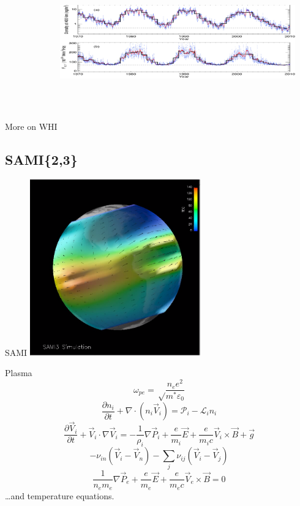 \documentclass{beamer}
\begin{document}
\begin{frame}
  {More on WHI}
  \includegraphics[width=4in,height=3in]{whi}
\end{frame}

\subsection{SAMI\{2,3\}}
\begin{frame}{SAMI}
 \includegraphics[height=3.0in]{SAMI}
\end{frame}

\begin{frame}{Plasma}
  \vspace{-1cm}
  \[ \omega_{pe} = \sqrt\frac{n_e e^2}{m^*\varepsilon_0} \]
  \[ \frac{\partial n_i}{\partial t} + \nabla \cdot \left( n_i\vec V_i \right) = \mathcal P_i - \mathcal L_i n_i \]
  \[ \frac{\partial \vec V_i}{\partial t} + \vec V_i \cdot \nabla \vec V_i = 
     -\frac1{\rho_i} \nabla\vec P_i 
     + \frac e{m_i}\vec E + \frac e{m_ic} \vec V_i \times \vec B 
     +\vec g \]
  \[  -\nu_{in} \left( \vec V_i -\vec V_n \right)
     -\sum_j \nu_{ij} \left( \vec V_i -\vec V_j\right) \]
  \[\frac1{n_e m_e} \nabla \vec P_e + \frac e{m_e} \vec E + \frac e{m_ec} \vec V_e \times \vec B = 0 \]
\ldots and temperature equations.
\end{frame}
\end{document}
